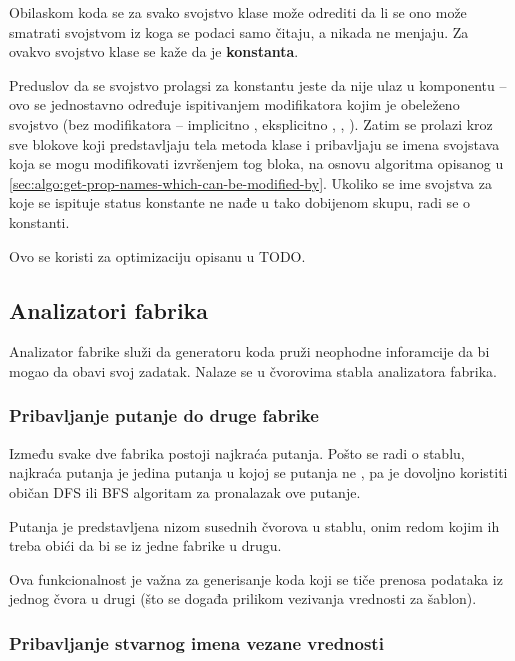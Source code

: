 Obilaskom koda se za svako svojstvo klase može odrediti da li se ono može smatrati svojstvom iz koga se podaci samo čitaju, a nikada ne menjaju.
Za ovakvo svojstvo klase se kaže da je \textbf{konstanta}.

Preduslov da se svojstvo prolagsi za konstantu jeste da nije ulaz u komponentu -- ovo se jednostavno određuje ispitivanjem modifikatora kojim je obeleženo svojstvo (bez modifikatora -- implicitno , eksplicitno , , ).
Zatim se prolazi kroz sve blokove koji predstavljaju tela metoda klase i pribavljaju se imena svojstava koja se mogu modifikovati izvršenjem tog bloka, na osnovu algoritma opisanog u \cref{sec:algo:get-prop-names-which-can-be-modified-by}.
Ukoliko se ime svojstva za koje se ispituje status konstante ne nađe u tako dobijenom skupu, radi se o konstanti.

Ovo se koristi za optimizaciju opisanu u TODO.

\subsection{Analizatori fabrika}

Analizator fabrike služi da generatoru koda pruži neophodne inforamcije da bi mogao da obavi svoj zadatak.
Nalaze se u čvorovima stabla analizatora fabrika.

\subsubsection{Pribavljanje putanje do druge fabrike} %

Između svake dve fabrika postoji najkraća putanja.
Pošto se radi o stablu, najkraća putanja je jedina putanja u kojoj se putanja ne , pa je dovoljno koristiti običan DFS ili BFS algoritam za pronalazak ove putanje.

Putanja je predstavljena nizom susednih čvorova u stablu, onim redom kojim ih treba obići da bi se iz jedne fabrike  u drugu.

Ova funkcionalnost je važna za generisanje koda koji se tiče prenosa podataka iz jednog čvora u drugi (što se događa prilikom vezivanja vrednosti za šablon).

\subsubsection{Pribavljanje stvarnog imena vezane vrednosti} %

